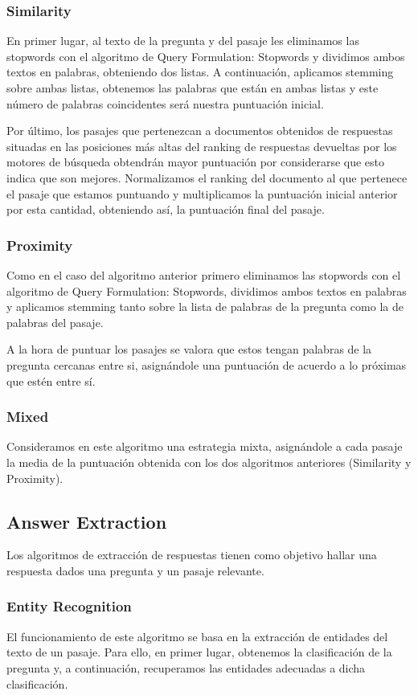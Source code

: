 \documentclass[12pt,a4paper,titlepage]{article}
\begin{document}
\subsubsection{Similarity}
En primer lugar, al texto de la pregunta y del pasaje les eliminamos las stopwords con el algoritmo de Query Formulation: Stopwords y dividimos ambos textos en palabras, obteniendo dos listas. A continuación, aplicamos stemming sobre ambas listas, obtenemos las palabras que están en ambas listas y este número de palabras coincidentes será nuestra puntuación inicial.

Por último, los pasajes que pertenezcan a documentos obtenidos de respuestas situadas en las posiciones más altas del ranking de respuestas devueltas por los motores de búsqueda obtendrán mayor puntuación por considerarse que esto indica que son mejores. Normalizamos el ranking del documento al que pertenece el pasaje que estamos puntuando y multiplicamos la puntuación inicial anterior por esta cantidad, obteniendo así, la puntuación final del pasaje.

\subsubsection{Proximity}
Como en el caso del algoritmo anterior primero eliminamos las stopwords con el algoritmo de Query Formulation: Stopwords, dividimos ambos textos en palabras y aplicamos stemming tanto sobre la lista de palabras de la pregunta como la de palabras del pasaje.

A la hora de puntuar los pasajes se valora que estos tengan palabras de la pregunta cercanas entre si, asignándole una puntuación de acuerdo a lo próximas que estén entre sí.

\subsubsection{Mixed}
Consideramos en este algoritmo una estrategia mixta, asignándole a cada pasaje la media de la puntuación obtenida con los dos algoritmos anteriores (Similarity y Proximity).

\subsection{Answer Extraction}
Los algoritmos de extracción de respuestas tienen como objetivo hallar una respuesta dados una pregunta y un pasaje relevante.

\subsubsection{Entity Recognition}
\label{s:ne_recog}
El funcionamiento de este algoritmo se basa en la extracción de entidades del texto de un pasaje. Para ello, en primer lugar, obtenemos la clasificación de la pregunta y, a continuación, recuperamos las entidades adecuadas a dicha clasificación.
\end{document}
